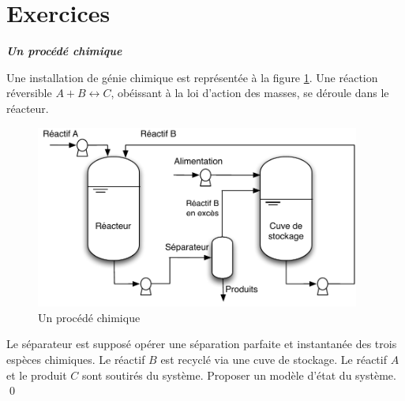\section{Exercices}

\begin{exercice}{\bf \em Un procédé chimique}

Une installation de génie chimique est représentée à la figure
\ref{Fig:genchim}. Une réaction réversible $A+B \leftrightarrow C$, obéissant
à la loi d'action des masses, se déroule dans le réacteur.
\begin{figure}[htbp] 
   \centering
   \includegraphics[height=6cm]{genchim} 
   \caption{Un procédé chimique}
   \label{Fig:genchim}
\end{figure}
 Le séparateur est
supposé opérer une séparation parfaite et instantanée des trois
espèces chimiques. Le réactif $B$ est recyclé via une cuve de
stockage. Le réactif $A$ et le produit $C$ sont soutirés du système.
Proposer un modèle d'état du système. \qed
\end{exercice}
\vv


